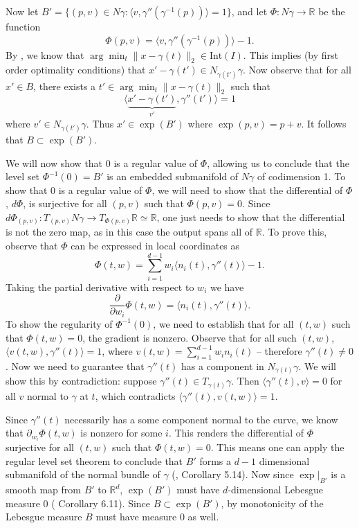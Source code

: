 \documentclass[11pt]{article}
\begin{document}
Now let $B'= \{(p,v) \in N\gamma : \langle v,  \gamma''(\gamma^{-1}(p))\rangle = 1\}$, and let $\Phi:N\gamma \rightarrow \mathbb{R}$ be the function
\[\Phi(p,v) = \langle v, \gamma''(\gamma^{-1}(p))\rangle - 1.\]
By , we know that $\arg \min_t\|x - \gamma(t)\|_2 \in \text{Int}(I)$. This implies (by first order optimality conditions) that $x' - \gamma(t') \in N_{\gamma(t')}\gamma$. Now observe that for all $x' \in B$, there exists a $t' \in \arg\min_t \|x-\gamma(t)\|_2$ such that \[\langle \underbrace{x' - \gamma(t')}_{v'}, \gamma''(t')\rangle = 1\] where $v' \in N_{\gamma(t')}\gamma$. Thus $x' \in \exp(B')$ where $\exp(p,v) = p + v$. It follows that $B\subset \exp(B')$.

We will now show that $0$ is a regular value of $\Phi$, allowing us to conclude that the level set $\Phi^{-1}(0) = B'$ is an embedded submanifold of $N\gamma$ of codimension 1. To show that $0$ is a regular value of $\Phi$, we will need to show that the differential of $\Phi$, $d\Phi$, is surjective for all $(p,v)$ such that $\Phi(p,v) = 0$. Since $d\Phi_{(p,v)}: T_{(p,v)}N\gamma \rightarrow T_{\Phi(p,v)}\mathbb{R} \simeq\mathbb{R}$, one just needs to show that the differential is not the zero map, as in this case the output spans all of $\mathbb{R}$. To prove this, observe that $\Phi$ can be expressed in local coordinates as
\[\Phi(t,w) = \sum_{i = 1}^{d-1}w_i\langle n_i(t), \gamma''(t)\rangle - 1.\]
Taking the partial derivative with respect to $w_i$ we have
\[\frac{\partial}{\partial w_i}\Phi(t,w) = \langle n_i(t), \gamma''(t)\rangle.\]
To show the regularity of $\Phi^{-1}(0)$, we need to establish that for all $(t,w)$ such that $\Phi(t,w) = 0$, the gradient is nonzero. Observe that for all such $(t,w)$, $\langle v(t,w), \gamma''(t)\rangle = 1$, where $v(t,w) = \sum_{i = 1}^{d-1}w_in_{i}(t)$ -- therefore $\gamma''(t) \neq 0$. Now we need to guarantee that $\gamma''(t)$ has a component in $N_{\gamma(t)}\gamma$. We will show this by contradiction: suppose $\gamma''(t) \in T_{\gamma(t)}\gamma$. Then $\langle\gamma''(t), v\rangle = 0$ for all $v$ normal to $\gamma$ at $t$, which contradicts $\langle \gamma''(t), v(t,w) \rangle = 1$.

Since $\gamma''(t)$ necessarily has a some component normal to the curve, we know that $\partial_{w_i}\Phi(t,w)$ is nonzero for some $i$. This renders the differential of $\Phi$ surjective for all $(t,w)$ such that $\Phi(t,w) = 0$. This means one can apply the regular level set theorem to conclude that $B'$ forms a $d-1$ dimensional submanifold of the normal bundle of $\gamma$ (\citet{lee2003smooth}, Corollary 5.14). Now since $\exp\big|_{B'}$ is a smooth map from $B'$ to $\mathbb{R}^d$, $\exp(B')$ must have $d$-dimensional Lebesgue measure $0$ (\citet{lee2003smooth} Corollary 6.11). Since $B \subset \exp(B')$, by monotonicity of the Lebesgue measure $B$ must have measure $0$ as well.
\end{document}
